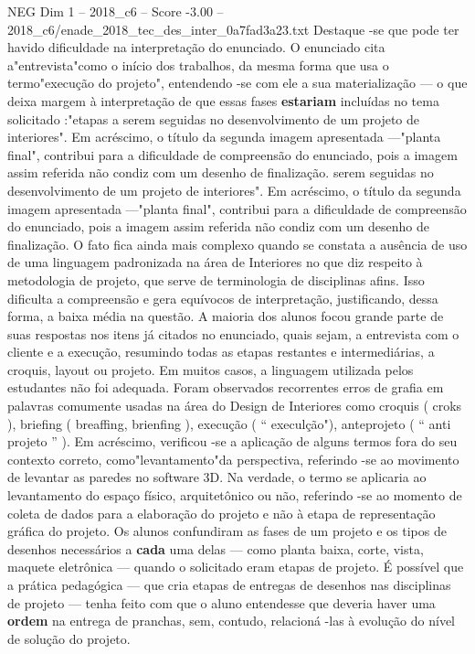 \begin{textsample}{NEG Dim 1 – 2018\_c6 – Score -3.00 – 2018\_c6/enade\_2018\_tec\_des\_inter\_0a7fad3a23.txt}
Destaque -se que pode ter havido dificuldade na interpretação do enunciado.
O enunciado cita a"entrevista"como o início dos trabalhos, da mesma forma que usa o termo"execução do projeto", entendendo -se com ele a sua materialização — o que deixa margem à interpretação de que essas fases \textbf{estariam} incluídas no tema solicitado :"etapas a serem seguidas no desenvolvimento de um projeto de interiores".
Em acréscimo, o título da segunda imagem apresentada —"planta final", contribui para a dificuldade de compreensão do enunciado, pois a imagem assim referida não condiz com um desenho de finalização. serem seguidas no desenvolvimento de um projeto de interiores".
Em acréscimo, o título da segunda imagem apresentada —"planta final", contribui para a dificuldade de compreensão do enunciado, pois a imagem assim referida não condiz com um desenho de finalização.
O fato fica ainda mais complexo quando se constata a ausência de uso de uma linguagem padronizada na área de Interiores no que diz respeito à metodologia de projeto, que serve de terminologia de disciplinas afins.
Isso dificulta a compreensão e gera equívocos de interpretação, justificando, dessa forma, a baixa média na questão.
A maioria dos alunos focou grande parte de suas respostas nos itens já citados no enunciado, quais sejam, a entrevista com o cliente e a execução, resumindo todas as etapas restantes e intermediárias, a croquis, layout ou projeto.
Em muitos casos, a linguagem utilizada pelos estudantes não foi adequada.
Foram observados recorrentes erros de grafia em palavras comumente usadas na área do Design de Interiores como croquis ( croks ), briefing ( breaffing, brienfing ), execução ( “ execulção"), anteprojeto ( “ anti projeto ” ).
Em acréscimo, verificou -se a aplicação de alguns termos fora do seu contexto correto, como"levantamento"da perspectiva, referindo -se ao movimento de levantar as paredes no software 3D.
Na verdade, o termo se aplicaria ao levantamento do espaço físico, arquitetônico ou não, referindo -se ao momento de coleta de dados para a elaboração do projeto e não à etapa de representação gráfica do projeto.
Os alunos confundiram as fases de um projeto e os tipos de desenhos necessários a \textbf{cada} uma delas — como planta baixa, corte, vista, maquete eletrônica — quando o solicitado eram etapas de projeto.
É possível que a prática pedagógica — que cria etapas de entregas de desenhos nas disciplinas de projeto — tenha feito com que o aluno entendesse que deveria haver uma \textbf{ordem} na entrega de pranchas, sem, contudo, relacioná -las à evolução do nível de solução do projeto.

\end{textsample}
